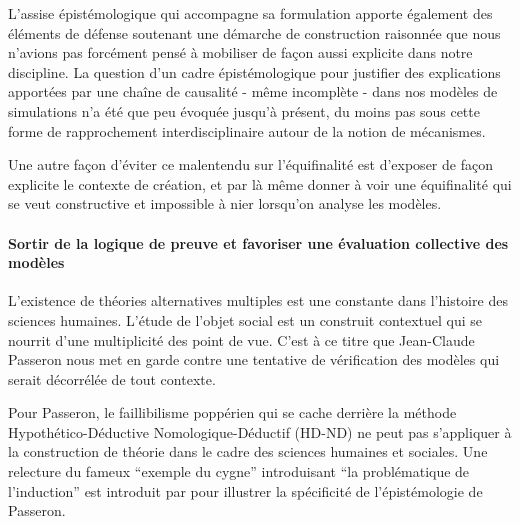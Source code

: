 L'assise épistémologique qui accompagne sa formulation apporte également des éléments de défense soutenant une démarche de construction raisonnée que nous n'avions pas forcément pensé à mobiliser de façon aussi explicite dans notre discipline. La question d'un cadre épistémologique pour justifier des explications apportées par une chaîne de causalité - même incomplète - dans nos modèles de simulations n'a été que peu évoquée jusqu'à présent, du moins pas sous cette forme de rapprochement interdisciplinaire autour de la notion de mécanismes.



Une autre façon d'éviter ce malentendu sur l'équifinalité est d'exposer de façon explicite le contexte de création, et par là même donner à voir une équifinalité qui se veut constructive et impossible à nier lorsqu'on analyse les modèles.

\paragraph{Sortir de la logique de preuve et favoriser une évaluation collective des modèles}
\label{p:preuve}


L’existence de théories alternatives multiples est une constante dans l’histoire des sciences humaines. L'étude de l'objet social est un construit contextuel qui se nourrit d'une multiplicité des point de vue. C'est à ce titre que Jean-Claude Passeron \autocite{Passeron2006} nous met en garde contre une tentative de vérification  des modèles qui serait décorrélée de tout contexte.

Pour Passeron, le faillibilisme poppérien qui se cache derrière la méthode Hypothético-Déductive Nomologique-Déductif (HD-ND) ne peut pas s'appliquer à la construction de théorie dans le cadre des sciences humaines et sociales. Une relecture du fameux \enquote{exemple du cygne} introduisant \enquote{la problématique de l'induction} est introduit par \cite{Allard2000} pour illustrer la spécificité de l'épistémologie de Passeron.

